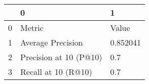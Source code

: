 \begin{tabular}{lll}
\toprule
{} &                       0 &         1 \\
\midrule
0 &                  Metric &     Value \\
1 &       Average Precision &  0.852041 \\
2 &  Precision at 10 (P@10) &       0.7 \\
3 &     Recall at 10 (R@10) &       0.7 \\
\bottomrule
\end{tabular}
